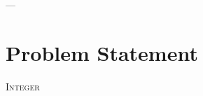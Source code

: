 
\begin{savequote}[85mm]
          {\color{stdgrey}---}
      
\end{savequote}
      
\chapter{Problem Statement}
\label{chap:3rd_chapter}
      
 \lettrine[lines=4,findent=5pt]{\textcolor{stdgrey}{I}}{nteger} 
      


%   

